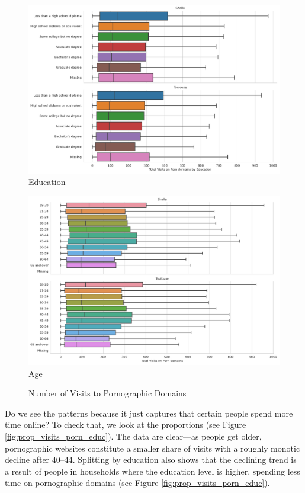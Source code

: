 \documentclass[12pt, letterpaper]{article}
\begin{document}
\begin{figure}[!htb]
\centering
\caption{Number of Visits to Pornographic Domains}\label{fig:total_visits_porn}
	\begin{minipage}[b]{0.47\textwidth}
	\centering
	\label{fig:total_visits_porn_educ}
	\includegraphics[width=\textwidth]{figs/total_visits_porn_educ.pdf}\\Education
	\end{minipage}
	\begin{minipage}[b]{0.47\textwidth}
	\centering
	\label{fig:total_visits_porn_age}
	\includegraphics[width=\textwidth]{figs/total_visits_porn_age.pdf}\\Age
	\end{minipage}
\end{figure}

Do we see the patterns because it just captures that certain people spend more time online? To check that, we look at the proportions (see Figure \ref{fig:prop_visits_porn_educ}). The data are clear---as people get older, pornographic websites constitute a smaller share of visits with a roughly monotic decline after 40--44. Splitting by education also shows that the declining trend is a result of people in households where the education level is higher, spending less time on pornographic domains (see Figure \ref{fig:prop_visits_porn_educ}).
\end{document}
